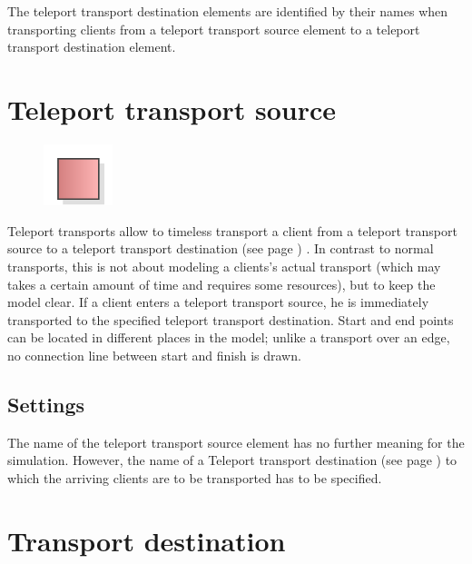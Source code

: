 The teleport transport destination elements are identified by their names when transporting
clients from a teleport transport source element to a teleport transport destination element.


\section{Teleport transport source}
\label{ref:ModelElementTeleportSource}

\begin{figure}
\vspace{-22pt}
\includegraphics[width=2cm]{imageModelElementTeleportSource.png}
\vspace{-22pt}
\end{figure}

Teleport transports allow to timeless transport a client from a teleport transport source
to a teleport transport destination (see page \pageref{ref:ModelElementTeleportDestination}) .
In contrast to normal transports, this is not about modeling a clients's actual transport
(which may takes a certain amount of time and requires some resources), but to keep the model clear.
If a client enters a teleport transport source, he is immediately transported to the specified
teleport transport destination. Start and end points can be located in different places in the model;
unlike a transport over an edge, no connection line between start and finish is drawn.

\subsection*{Settings}

The name of the teleport transport source element has no further meaning for the simulation.
However, the name of a Teleport transport destination (see page \pageref{ref:ModelElementTeleportDestination}) 
to which the arriving clients are to be transported has to be specified.


\section{Transport destination}
\label{ref:ModelElementTransportDestination}

